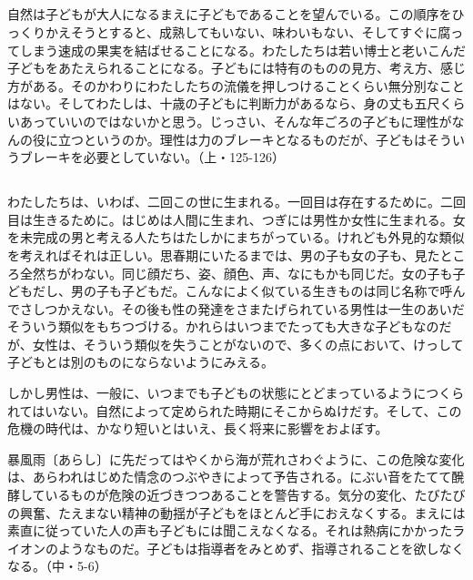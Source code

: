 \subsection{}


自然は子どもが大人になるまえに子どもであることを望んでいる。この順序をひっくりかえそうとすると、成熟してもいない、味わいもない、そしてすぐに腐ってしまう速成の果実を結ばせることになる。わたしたちは若い博士と老いこんだ子どもをあたえられることになる。子どもには特有のものの見方、考え方、感じ方がある。そのかわりにわたしたちの流儀を押しつけることくらい無分別なことはない。そしてわたしは、十歳の子どもに判断力があるなら、身の丈も五尺くらいあっていいのではないかと思う。じっさい、そんな年ごろの子どもに理性がなんの役に立つというのか。理性は力のブレーキとなるものだが、子どもはそういうブレーキを必要としていない。（上・125-126）

\subsection{}



わたしたちは、いわば、二回この世に生まれる。一回目は存在するために。二回目は生きるために。はじめは人間に生まれ、つぎには男性か女性に生まれる。女を未完成の男と考える人たちはたしかにまちがっている。けれども外見的な類似を考えればそれは正しい。思春期にいたるまでは、男の子も女の子も、見たところ全然ちがわない。同じ顔だち、姿、顔色、声、なにもかも同じだ。女の子も子どもだし、男の子も子どもだ。こんなによく似ている生きものは同じ名称で呼んでさしつかえない。その後も性の発達をさまたげられている男性は一生のあいだそういう類似をもちつづける。かれらはいつまでたっても大きな子どもなのだが、女性は、そういう類似を失うことがないので、多くの点において、けっして子どもとは別のものにならないようにみえる。

しかし男性は、一般に、いつまでも子どもの状態にとどまっているようにつくられてはいない。自然によって定められた時期にそこからぬけだす。そして、この危機の時代は、かなり短いとはいえ、長く将来に影響をおよぼす。

暴風雨〔あらし〕に先だってはやくから海が荒れさわぐように、この危険な変化は、あらわれはじめた情念のつぶやきによって予告される。にぶい音をたてて醗酵しているものが危険の近づきつつあることを警告する。気分の変化、たびたびの興奮、たえまない精神の動揺が子どもをほとんど手におえなくする。まえには素直に従っていた人の声も子どもには聞こえなくなる。それは熱病にかかったライオンのようなものだ。子どもは指導者をみとめず、指導されることを欲しなくなる。（中・5-6）

